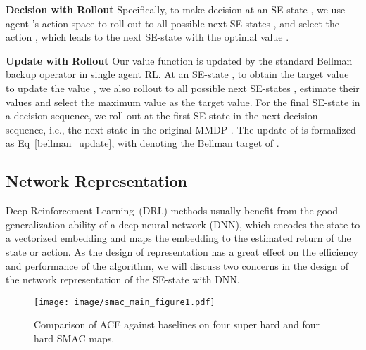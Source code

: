 \documentclass[letterpaper]{article} \usepackage{aaai23}  \usepackage{times}  \usepackage{helvet}  \usepackage{courier}  \usepackage[hyphens]{url}  \usepackage{graphicx} \urlstyle{rm} \def\UrlFont{\rm}  \usepackage{natbib}  \usepackage{caption} \frenchspacing  \setlength{\pdfpagewidth}{8.5in} \setlength{\pdfpageheight}{11in} \usepackage{algorithm}
\begin{document}
\textbf{Decision with Rollout} Specifically, to make decision at an SE-state , we use agent 's action space  to roll out to all possible next SE-states , and select the action , which leads to the next SE-state with the optimal value .

\textbf{Update with Rollout} Our value function  is updated by the standard Bellman backup operator in single agent RL. At an SE-state , to obtain the target value to update the value , we also rollout to all possible next SE-states , estimate their values  and select the maximum value as the target value. For the final SE-state  in a decision sequence, we roll out at the first SE-state  in the next decision sequence, i.e., the next state in the original MMDP . The update of  is formalized as Eq~\ref{bellman_update}, with  denoting the Bellman target of .

\vspace{-4mm}
\vspace{-1ex}
\subsection{Network Representation}
Deep Reinforcement Learning~(DRL) methods usually benefit from the good generalization ability of a deep neural network (DNN), which encodes the state to a vectorized embedding and maps the embedding to the estimated return of the state or action. As the design of representation has a great effect on the efficiency and performance of the algorithm, we will discuss two concerns in the design of the network representation of the SE-state  with DNN.


\begin{figure*}[t]
    \centering
    \texttt{[image: image/smac\_main\_figure1.pdf]}
\vspace{-2ex}
    \caption{Comparison of ACE against baselines on four super hard and four hard SMAC maps.}
\vspace{-4ex}
    \label{fig:smac_main_figure}
\end{figure*}
\end{document}
